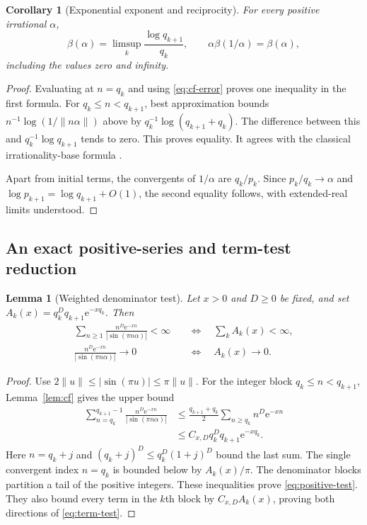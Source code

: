 \documentclass[11pt,a4paper]{article}
\numberwithin{equation}{section}
\newtheorem{lemma}[theorem]{Lemma}
\newtheorem{corollary}[theorem]{Corollary}
\theoremstyle{definition}
\theoremstyle{remark}
\newcommand{\e}{\mathrm e}
\begin{document}
\begin{corollary}[Exponential exponent and reciprocity]
\label{cor:beta}
For every positive irrational $\alpha$,
\begin{equation}
 \beta(\alpha)=\limsup_k\frac{\log q_{k+1}}{q_k},
 \qquad \alpha\beta(1/\alpha)=\beta(\alpha),
 \label{eq:beta-cf}
\end{equation}
including the values zero and infinity.
\end{corollary}
\begin{proof}
Evaluating at $n=q_k$ and using \eqref{eq:cf-error} proves one inequality
in the first formula. For $q_k\le n<q_{k+1}$, best approximation bounds
$n^{-1}\log(1/\|n\alpha\|)$ above by
$q_k^{-1}\log(q_{k+1}+q_k)$. The difference between this and
$q_k^{-1}\log q_{k+1}$ tends to zero. This proves equality. It agrees
with the classical irrationality-base formula \cite{sondow}.

Apart from initial terms, the convergents of $1/\alpha$ are $q_k/p_k$.
Since $p_k/q_k\to\alpha$ and
$\log p_{k+1}=\log q_{k+1}+O(1)$, the second equality follows, with
extended-real limits understood.
\end{proof}

\subsection{An exact positive-series and term-test reduction}

\begin{lemma}[Weighted denominator test]
\label{lem:weighted-test}
Let $x>0$ and $D\ge0$ be fixed, and set
$A_k(x)=q_k^Dq_{k+1}\e^{-xq_k}$. Then
\begin{align}
 \sum_{n\ge1}\frac{n^D\e^{-xn}}{|\sin(\pi n\alpha)|}<\infty
 &\quad\Longleftrightarrow\quad \sum_k A_k(x)<\infty,
 \label{eq:positive-test}\\
 \frac{n^D\e^{-xn}}{|\sin(\pi n\alpha)|}\longrightarrow0
 &\quad\Longleftrightarrow\quad A_k(x)\longrightarrow0.
 \label{eq:term-test}
\end{align}
\end{lemma}
\begin{proof}
Use $2\|u\|\le|\sin(\pi u)|\le\pi\|u\|$. For the integer block
$q_k\le n<q_{k+1}$, Lemma~\ref{lem:cf} gives the upper bound
\begin{align*}
 \sum_{n=q_k}^{q_{k+1}-1}
       \frac{n^D\e^{-xn}}{|\sin(\pi n\alpha)|}
 &\le\frac{q_{k+1}+q_k}{2}
                \sum_{n\ge q_k}n^D\e^{-xn}\\
 &\le C_{x,D}q_k^Dq_{k+1}\e^{-xq_k}.
\end{align*}
Here $n=q_k+j$ and $(q_k+j)^D\le q_k^D(1+j)^D$ bound the last sum.
The single convergent index $n=q_k$ is bounded below by
$A_k(x)/\pi$. The denominator blocks partition a tail of the positive
integers. These inequalities prove \eqref{eq:positive-test}. They also
bound every term in the $k$th block by $C_{x,D}A_k(x)$, proving both
directions of \eqref{eq:term-test}.
\end{proof}
\end{document}
